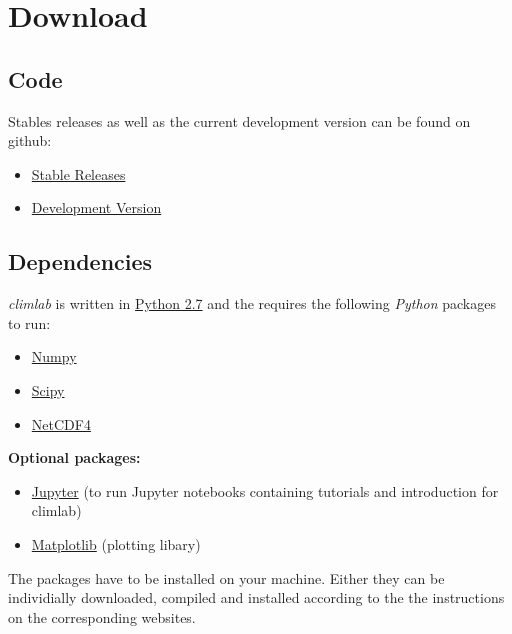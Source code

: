 \documentclass[a4paper,10pt,english]{sphinxmanual}
\begin{document}
\chapter{Download}
\label{download:download}\label{download::doc}

\section{Code}
\label{download:code}
Stables releases as well as the current development version can be found on github:
\begin{itemize}
\item {} 
\href{https://github.com/brian-rose/climlab/releases}{Stable Releases}

\item {} 
\href{https://github.com/brian-rose/climlab}{Development Version}

\end{itemize}


\section{Dependencies}
\label{download:dependencies}
\emph{climlab} is written in \href{https://www.python.org/downloads/}{Python 2.7} and the requires the following \emph{Python} packages to run:
\begin{itemize}
\item {} 
\href{http://www.numpy.org/}{Numpy}

\item {} 
\href{https://www.scipy.org/}{Scipy}

\item {} 
\href{https://unidata.github.io/netcdf4-python/}{NetCDF4}

\end{itemize}

\textbf{Optional packages:}
\begin{itemize}
\item {} 
\href{http://jupyter.org/}{Jupyter} (to run Jupyter notebooks containing tutorials and introduction for climlab)

\item {} 
\href{http://matplotlib.org/}{Matplotlib} (plotting libary)

\end{itemize}

The packages have to be installed on your machine. Either they can be individially downloaded, compiled and installed according to the the instructions on the corresponding websites.
\end{document}
